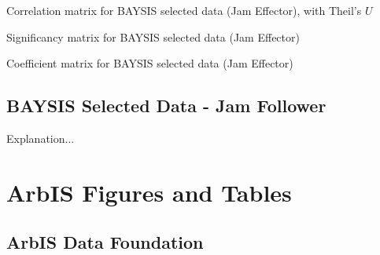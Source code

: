 \begin{appendices}
    \begin{table}
    	\tiny
    	\setlength{\tabcolsep}{2pt}
    	\centering
    	
    	\caption{Correlation matrix for BAYSIS selected data (Jam Effector), with Theil's $U$}
    	\label{table:appendix_correlation_matrix_selected_startJam_cramers}
    \end{table}
    
    \begin{table}
    	\tiny
    	\setlength{\tabcolsep}{2pt}
    	\centering
    	
    	\caption{Significancy matrix for BAYSIS selected data (Jam Effector)}
    	\label{table:appendix_significancy_matrix_selected_startJam}
    \end{table}
    \restoregeometry
    
    \begin{table}
    	\tiny
    	\setlength{\tabcolsep}{2pt}
    	\centering
    	
    	\caption{Coefficient matrix for BAYSIS selected data (Jam Effector)}
    		\label{table:appendix_coefficient_matrix_selected_startJam}
    \end{table}
    \restoregeometry
    
    \tocless\section{BAYSIS Selected Data - Jam Follower}
    \label{appendix_baysis_selected_endJam}
    
    Explanation...
    
    \chapter{ArbIS Figures and Tables}
    \label{appendix_arbis}
    \tocless\section{ArbIS Data Foundation}
    \label{appendix_arbis_dataset}
    

\end{appendices}
